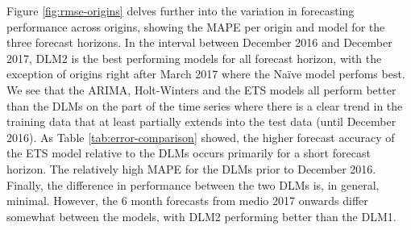 \documentclass[12pt, a4paper]{article}
\begin{document}

Figure \ref{fig:rmse-origins} delves further into the variation in
forecasting performance across origins, showing the MAPE per origin and
model for the three forecast horizons. In the interval between December
2016 and December 2017, DLM2 is the best performing models for all forecast horizon, with the exception of origins right after March
2017 where the Naïve model perfoms best. We see that the ARIMA,
Holt-Winters and the ETS models all perform better than the DLMs on the
part of the time series where there is a clear trend in the training
data that at least partially extends into the test data (until December
2016). As Table \ref{tab:error-comparison} showed, the higher forecast
accuracy of the ETS model relative to the DLMs occurs primarily for a
short forecast horizon. The relatively high MAPE for the DLMs prior to
December 2016. Finally, the difference in performance between the two
DLMs is, in general, minimal. However, the 6 month forecasts from medio
2017 onwards differ somewhat between the models, with DLM2 performing
better than the DLM1.
\end{document}
